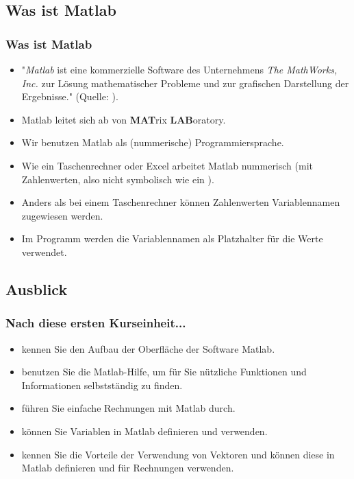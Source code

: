     \subsection{Was ist Matlab}
    \begin{frame}
        \frametitle{Was ist Matlab}

        \begin{itemize}
          \item "\emph{Matlab} ist eine kommerzielle Software des Unternehmens \emph{The MathWorks, Inc.} zur Lösung mathematischer Probleme
          und zur grafischen Darstellung der Ergebnisse." (Quelle: \href{https://de.wikipedia.org/wiki/Matlab}{}).
          \item Matlab leitet sich ab von \textbf{MAT}rix \textbf{LAB}oratory.
          \item Wir benutzen Matlab als (nummerische) Programmiersprache.
          \item Wie ein Taschenrechner oder Excel arbeitet Matlab nummerisch (mit Zahlenwerten, also nicht symbolisch wie
          ein \href{https://de.wikipedia.org/wiki/Computeralgebrasystem}{}).
          \item Anders als bei einem Taschenrechner können Zahlenwerten Variablennamen zugewiesen werden.
          \item Im Programm werden die Variablennamen als Platzhalter für die Werte verwendet.
        \end{itemize}
    \end{frame}

    \subsection{Ausblick}
    \begin{frame}
        \frametitle{Nach diese ersten Kurseinheit...}

        \begin{itemize}
          \itemsep0.3cm
          \item kennen Sie den Aufbau der Oberfläche der Software Matlab.
          \item benutzen Sie die Matlab-Hilfe, um für Sie nützliche Funktionen und Informationen selbstständig zu finden.
          \item führen Sie einfache Rechnungen mit Matlab durch.
          \item können Sie Variablen in Matlab definieren und verwenden.
          \item kennen Sie die Vorteile der Verwendung von Vektoren und können diese in Matlab definieren und für Rechnungen verwenden.
        \end{itemize}
    \end{frame}

